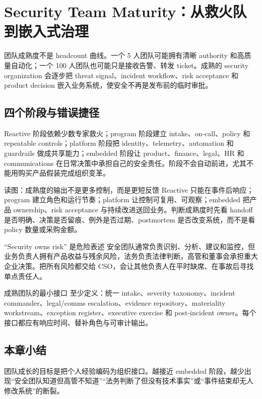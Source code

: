 \section{Security Team Maturity：从救火队到嵌入式治理}

团队成熟度不是 headcount 曲线。一个 5 人团队可能拥有清晰 authority 和高质量自动化；一个 100 人团队也可能只是接收告警、转发 ticket。成熟的 security organization 会逐步把 threat signal、incident workflow、risk acceptance 和 product decision 嵌入业务系统，使安全不再是发布前的临时审批。

\subsection{四个阶段与错误捷径}

Reactive 阶段依赖少数专家救火；program 阶段建立 intake、on-call、policy 和 repeatable controls；platform 阶段把 identity、telemetry、automation 和 guardrails 做成共享能力；embedded 阶段让 product、finance、legal、HR 和 communications 在日常决策中承担自己的安全责任。阶段不会自动前进，尤其不能用购买产品假装完成组织变革。


\begin{knowledgebox}{读图：成熟度的输出不是更多控制，而是更短反馈}
Reactive 只能在事件后响应；program 建立角色和运行节奏；platform 让控制可复用、可观察；embedded 把产品 ownership、risk acceptance 与持续改进送回业务。判断成熟度时先看 handoff 是否明确、决策是否留痕、例外是否过期、postmortem 是否改变系统，而不是看 policy 数量或采购金额。
\end{knowledgebox}

\begin{warningbox}{“Security owns risk” 是危险表述}
安全团队通常负责识别、分析、建议和监控，但业务负责人拥有产品收益与残余风险，法务负责法律判断，高管和董事会承担重大企业决策。把所有风险都交给 CSO，会让其他负责人在平时缺席、在事故后寻找单点责任人。
\end{warningbox}

\begin{importantbox}{成熟团队的最小接口}
至少定义：统一 intake、severity taxonomy、incident commander、legal/comms escalation、evidence repository、materiality workstream、exception register、executive exercise 和 post-incident owner。每个接口都应有响应时间、替补角色与可审计输出。
\end{importantbox}

\subsection{本章小结}

团队成长的目标是把个人经验编码为组织接口。越接近 embedded 阶段，越少出现“安全团队知道但高管不知道”“法务判断了但没有技术事实”或“事件结束却无人修改系统”的断裂。

